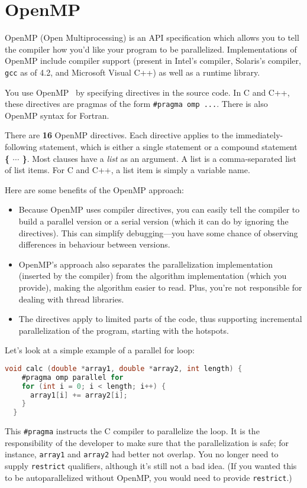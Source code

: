 




\section*{OpenMP}


OpenMP (Open Multiprocessing) 
is an API specification which allows you to tell the compiler how you'd 
like your program to be parallelized. Implementations of OpenMP 
include compiler support (present in Intel's compiler, Solaris's 
compiler, {\tt gcc} as of 4.2, and Microsoft Visual C++) as well as a 
runtime library.

You use OpenMP~\cite{omptutorial} by specifying
directives in the source code. In C and C++, these directives are
pragmas of the form \verb+#pragma omp ...+. There is also OpenMP
syntax for Fortran. 

There are {\bf 16} OpenMP directives. Each directive applies to the immediately-following statement, which is either a single statement or a compound statement {\bf \{  $\cdots$ \}}. Most clauses have a \emph{list} as an argument. 
A list is a comma-separated list of list items. For C and C++, a list item 
is simply a variable name.


Here are some benefits of the OpenMP approach:
\begin{itemize}
\item Because OpenMP uses compiler directives, you can easily tell the
  compiler to build a parallel version or a serial version (which it can do by
  ignoring the directives). This can simplify debugging---you
  have some chance of observing differences in behaviour between 
  versions.
\item OpenMP's approach also separates the parallelization
  implementation (inserted by the compiler) from the algorithm
  implementation (which you provide), making the algorithm easier to
  read. Plus, you're not responsible for dealing with thread libraries.
\item The directives apply to limited parts of the code, thus supporting
  incremental parallelization of the program, starting with the hotspots.
\end{itemize}

Let's look at a simple example of a parallel for loop:
{\small
\begin{lstlisting}[language=C,morekeywords={foreach,pragma,omp,parallel,single,nowait,task,untied,barrier,taskyield}]
  void calc (double *array1, double *array2, int length) {
    #pragma omp parallel for
    for (int i = 0; i < length; i++) {
      array1[i] += array2[i];
    }
  }
\end{lstlisting}
}
This \verb+#pragma+ instructs the C compiler to parallelize the
loop. It is the responsibility of the developer to make sure that
the parallelization is safe; for instance, {\tt array1} and {\tt array2}
had better not overlap. You no longer need to supply {\tt restrict}
qualifiers, although it's still not a bad idea. (If you wanted this
to be autoparallelized without OpenMP, you would need to provide
{\tt restrict}.)

